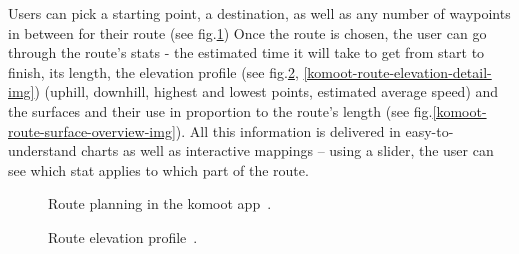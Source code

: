 Users can pick a starting point, a destination, as well as any number of waypoints in between for their route (see fig.\ref{komoot-nav-img})
Once the route is chosen, the user can go through the route's stats - the estimated time it will take to get from start to finish, its length, the elevation profile (see fig.\ref{komoot-route-details-img}, \ref{komoot-route-elevation-detail-img}) (uphill, downhill, highest and lowest points, estimated average speed) and the surfaces and their use in proportion to the route's length (see fig.\ref{komoot-route-surface-overview-img}).
All this information is delivered in easy-to-understand charts as well as interactive mappings -- using a slider, the user can see which stat applies to which part of the route.

\begin{figure}[h!]
    \centering
        \caption{Route planning in the komoot app~\cite{komoot-nav-img}.}
        \label{komoot-nav-img}
\end{figure}

\begin{figure}[h!]
    \centering
        \caption{Route elevation profile~\cite{komoot-route-details-img}.}
        \label{komoot-route-details-img}
\end{figure}

